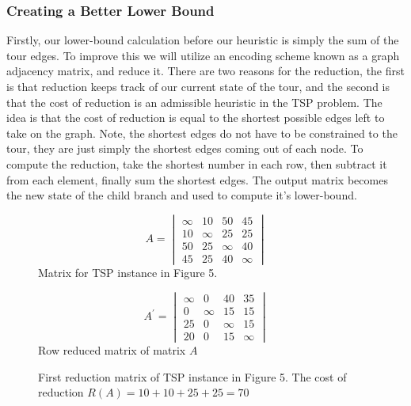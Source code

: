     \subsubsection{Creating a Better Lower Bound}
    Firstly, our lower-bound calculation before our heuristic is simply the sum 
    of the tour edges. To improve this we will utilize an encoding scheme known as 
    a graph adjacency matrix, and reduce it. There are two reasons for the reduction, 
    the first is that reduction keeps track of our current state of the tour, and the second
    is that the cost of reduction is an admissible heuristic in the TSP problem.
    The idea is that the cost of reduction is equal to the shortest possible edges left to
    take on the graph. Note, the shortest edges do not have to be constrained to the tour, they
    are just simply the shortest edges coming out of each node. To compute the reduction, take the
    shortest number in each row, then subtract it from each element, finally sum the shortest edges.
    The output matrix becomes the new state of the child branch and used to compute it's lower-bound.\\
    
    \begin{figure}
        \begin{minipage}{.5\linewidth}
          \centering
          \begin{equation*}
            A = 
            \begin{vmatrix}
                \infty & 10 & 50 & 45\\
                10 & \infty & 25 & 25 \\
                50 & 25 & \infty & 40 \\
                45 & 25 & 40 & \infty
	        \end{vmatrix}
          \end{equation*}
          Matrix for TSP instance in Figure 5.
        \end{minipage}%
        \begin{minipage}{.5\linewidth}
          \centering
          \begin{equation*}
            A^{'} = 
                \begin{vmatrix}
                    \infty & 0 & 40 & 35\\
                    0 & \infty & 15 & 15 \\
                    25 & 0 & \infty & 15 \\
                    20 & 0 & 15 & \infty
                \end{vmatrix}
            \end{equation*}
          Row reduced matrix of matrix $A$\\
        \end{minipage}
        \caption{First reduction matrix of TSP instance in Figure 5.
                The cost of reduction $ R(A) = 10 + 10 + 25 + 25 = 70$}
      \end{figure}
      

